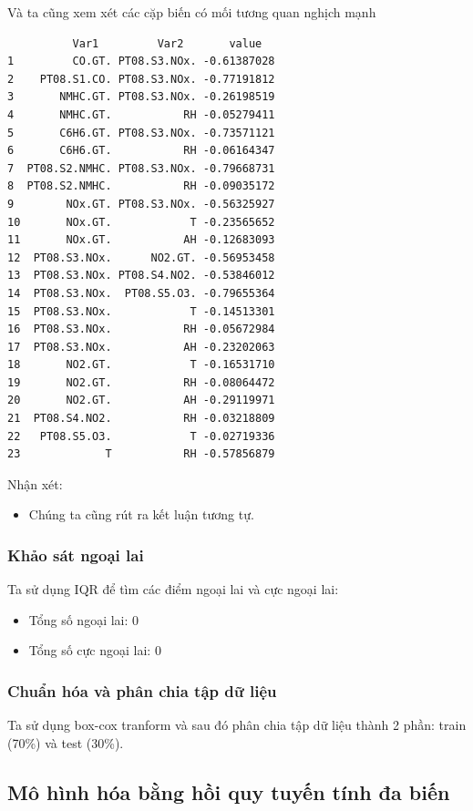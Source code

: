  Và ta cũng xem xét các cặp biến có mối tương quan nghịch mạnh
 \begin{lstlisting}
          Var1         Var2       value
1         CO.GT. PT08.S3.NOx. -0.61387028
2    PT08.S1.CO. PT08.S3.NOx. -0.77191812
3       NMHC.GT. PT08.S3.NOx. -0.26198519
4       NMHC.GT.           RH -0.05279411
5       C6H6.GT. PT08.S3.NOx. -0.73571121
6       C6H6.GT.           RH -0.06164347
7  PT08.S2.NMHC. PT08.S3.NOx. -0.79668731
8  PT08.S2.NMHC.           RH -0.09035172
9        NOx.GT. PT08.S3.NOx. -0.56325927
10       NOx.GT.            T -0.23565652
11       NOx.GT.           AH -0.12683093
12  PT08.S3.NOx.      NO2.GT. -0.56953458
13  PT08.S3.NOx. PT08.S4.NO2. -0.53846012
14  PT08.S3.NOx.  PT08.S5.O3. -0.79655364
15  PT08.S3.NOx.            T -0.14513301
16  PT08.S3.NOx.           RH -0.05672984
17  PT08.S3.NOx.           AH -0.23202063
18       NO2.GT.            T -0.16531710
19       NO2.GT.           RH -0.08064472
20       NO2.GT.           AH -0.29119971
21  PT08.S4.NO2.           RH -0.03218809
22   PT08.S5.O3.            T -0.02719336
23             T           RH -0.57856879
 \end{lstlisting}
Nhận xét:
\begin{itemize}
    \item Chúng ta cũng rút ra kết luận tương tự.
\end{itemize}

\subsubsection{Khảo sát ngoại lai}

Ta sử dụng IQR để tìm các điểm ngoại lai và cực ngoại lai:
\begin{itemize}
    \item Tổng số ngoại lai: 0
    \item Tổng số cực ngoại lai: 0
\end{itemize}

\subsubsection{Chuẩn hóa và phân chia tập dữ liệu}

Ta sử dụng box-cox tranform và sau đó phân chia tập dữ liệu thành 2 phần: train (70\%) và test (30\%).

\subsection{Mô hình hóa bằng hồi quy tuyến tính đa biến}

